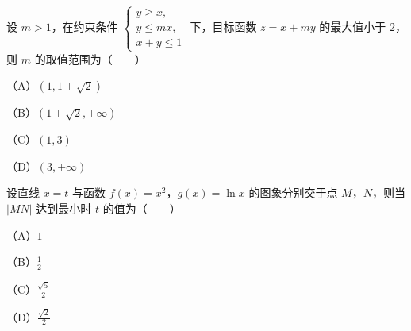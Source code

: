 \begin{question}
设 $m>1$，在约束条件 $\begin{cases}y\geqslant x,\\y\leqslant mx,\\x+y\leqslant1\end{cases}$ 下，目标函数 $z=x+my$ 的最大值小于 $2$，则 $m$ 的取值范围为\mbox{（　　）}

（A）$(1,1+\sqrt2)$

（B）$(1+\sqrt2,+\infty)$

（C）$(1,3)$

（D）$(3,+\infty)$

\end{question}
\begin{question}
设直线 $x=t$ 与函数 $f(x)=x^2$，$g(x)=\ln x$ 的图象分别交于点 $M$，$N$，则当 $|MN|$ 达到最小时 $t$ 的值为\mbox{（　　）}

（A）$1$

（B）$\frac12$

（C）$\frac{\sqrt5}2$

（D）$\frac{\sqrt2}2$

\end{question}

